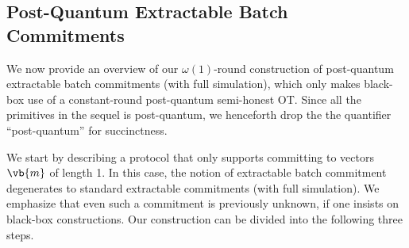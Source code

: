 \subsection{Post-Quantum Extractable Batch Commitments}
\label{sec:overview:PQBExtCom}

We now provide an overview of our $\omega(1)$-round construction of post-quantum extractable batch commitments (with full simulation), which only makes black-box use of a constant-round post-quantum semi-honest OT. Since all the primitives in the sequel is post-quantum, we henceforth drop the the quantifier ``post-quantum'' for succinctness.


We start by describing a protocol that only supports committing to vectors $\vb{m}$ of length 1. In this case, the notion of extractable batch commitment degenerates to standard extractable commitments (with full simulation). We emphasize that even such a commitment is previously unknown, if one insists on black-box constructions. Our construction can be divided into the following three steps. 
